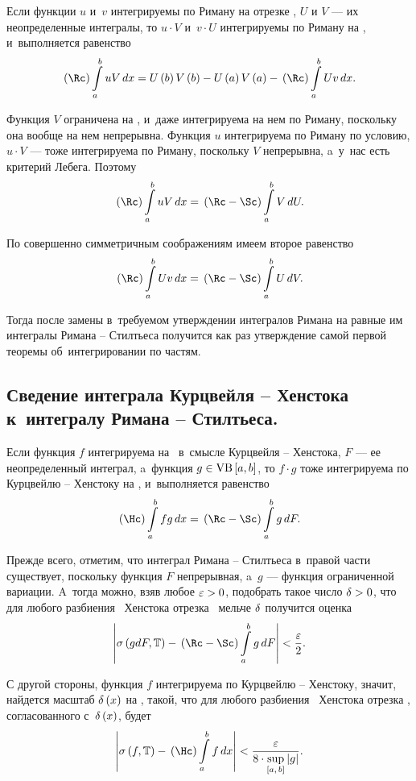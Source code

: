 \documentclass[draft]{article}
\begin{document}
Если функции $u$ и~$v$ интегрируемы по Риману на отрезке \ab, $U$ и
$V$
--- их неопределенные интегралы, то $u\cdot V$ и~$v\cdot U$
интегрируемы по Риману на \ab, и~выполняется равенство
$$\riman\intab uV,x=U\at(b)V\at(b)-U\at(a)V\at(a)-\riman\intab
Uv,x.$$

\pr

Функция $V$ ограничена на \ab, и~даже интегрируема на нем по Риману,
поскольку она вообще на нем непрерывна. Функция $u$ интегрируема по
Риману по условию, $u\cdot V$
--- тоже интегрируема по Риману, поскольку $V$ непрерывна, a~у~нас есть критерий
Лебега. Поэтому $$\riman\intab uV,x=\rimanst\intab V,U.$$

\eject

 По
совершенно симметричным соображениям имеем второе равенство
$$\riman\intab Uv,x=\rimanst\intab U,V.$$

Тогда после замены в~требуемом утверждении интегралов Римана на
равные им интегралы Римана -- Стилтьеса получится как раз
утверждение самой первой теоремы об~интегрировании по частям.

\primp

\subsection{Сведение интеграла Курцвейля -- Хенстока к~интегралу Римана --
Стилтьеса.}


Если функция $f$ интегрируема на \ab\ в~смысле Курцвейля --
Хенстока, $F$ --- ее неопределенный интеграл, a~функция
$g\isvb\segab$, то $f\cdot g$ тоже интегрируема по Курцвейлю --
Хенстоку на \ab, и~выполняется равенство $$\kurzh\intab
fg,x=\rimanst\intab g,F.$$

\pr

Прежде всего, отметим, что интеграл Римана -- Стилтьеса в~правой
части существует, поскольку функция $F$ непрерывная, a~$g$ ---
функция ограниченной вариации. A~тогда можно, взяв любое $\varepsilon > 0$,
подобрать такое число $\delta > 0$, что для любого разбиения \Tdixif\
Хенстока отрезка \ab\ мельче $\delta$ получится оценка
$$\abs{\isum(gdF,\T)-\rimanst\intab g,F}<{\ep\over2}.$$

С другой стороны, функция $f$ интегрируема по Курцвейлю -- Хенстоку,
значит, найдется масштаб $\dex$ на \ab, такой, что для любого
разбиения \Tdixif\ Хенстока отрезка \ab, согласованного с~$\dex$,
будет
$$\abs{\isfT-\kurzh\intabfdx}<{\ep\over8\cdot\sup\limits_{\seg[a,\,b]}\abs{g}}.$$
\end{document}
